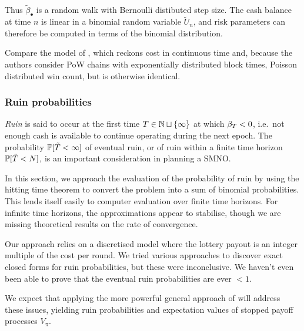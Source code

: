 Thus $\tilde{\beta}_\bullet$ is a random walk with Bernoulli distibuted step size.
%
The cash balance at time $n$ is linear in a binomial random variable $\tilde U_n$, and risk parameters can therefore be computed in terms of the binomial distribution.

\begin{remark}

  Compare the model of \cite[\S2]{hansjoerg2022profitability}, which reckons cost in continuous time and, because the authors consider PoW chains with exponentially distributed block times, Poisson distributed win count, but is otherwise identical.

\end{remark}

\subsubsection{Ruin probabilities}
\label{section:ruin}

\emph{Ruin} is said to occur at the first time $T\in\mathbb{N}\sqcup\{\infty\}$ at which $\beta_T < 0$, i.e.~not enough cash is available to continue operating during the next epoch.
%
The probability $\mathbb{P}[\tilde{T}<\infty]$ of eventual ruin, or of ruin within a finite time horizon $\mathbb{P}[\tilde{T}<N]$, is an important consideration in planning a SMNO.


In this section, we approach the evaluation of the probability of ruin by using the hitting time theorem to convert the problem into a sum of binomial probabilities.
%
This lends itself easily to computer evaluation over finite time horizons.
%
For infinite time horizons, the approximations appear to stabilise, though we are missing theoretical results on the rate of convergence.


\begin{remark}

Our approach relies on a discretised model where the lottery payout is an integer multiple of the cost per round.
%
We tried various approaches to discover exact closed forms for ruin probabilities, but these were inconclusive.
%
We haven't even been able to prove that the eventual ruin probabilities are ever $<1$.

We expect that applying the more powerful general approach of \cite{asmussen2010ruin,hansjoerg2022profitability} will address these issues, yielding ruin probabilities and expectation values of stopped payoff processes $V_\pi$.

\end{remark}


